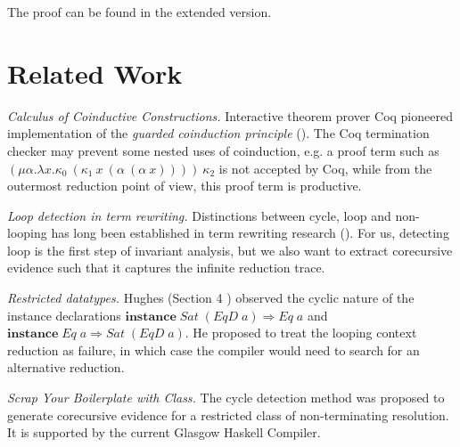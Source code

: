 \documentclass{llncs}
\newcommand{\Conid}[1]{\mathit{#1}}
\newcommand{\Varid}[1]{\mathit{#1}}
\begin{document}
The proof can be found in the extended version.













\section{Related Work}
\label{relwork}
\emph{Calculus of Coinductive Constructions.} Interactive theorem prover Coq pioneered implementation of the \textit{guarded coinduction principle} (\cite{coquand1994infinite,gimenez1996}).  
The Coq termination checker may prevent some nested uses of coinduction, e.g. a proof term such as $(\mu \alpha . \lambda x . \kappa_0\ (\kappa_1\ x\ (\alpha\ (\alpha\ x)))) \ \kappa_2$ is not accepted by Coq, while from the outermost reduction point of view, this proof term is productive. 

\emph{Loop detection in term rewriting.} Distinctions between cycle, loop and non-looping
 has long been established in term rewriting research (\cite{dershowitz1987,zantema1996non}). For us, detecting loop is the first step of invariant analysis, but we also want to extract corecursive evidence such that it captures the infinite reduction trace. 


\emph{Restricted datatypes.} Hughes (Section 4 \cite{hughes1999restricted})
observed the cyclic nature of the instance declarations \ensuremath{\mathbf{instance}\;\Conid{Sat}\;(\Conid{EqD}\;\Varid{a})\Rightarrow \Conid{Eq}\;\Varid{a}} and
\ensuremath{\mathbf{instance}\;\Conid{Eq}\;\Varid{a}\Rightarrow \Conid{Sat}\;(\Conid{EqD}\;\Varid{a})}. He proposed to treat the looping context
reduction as failure, in which case the compiler would need to search for an alternative
reduction. 


\emph{Scrap Your Boilerplate with Class.} The cycle
detection method \cite{Lammel:2005} was proposed to
generate corecursive evidence for a restricted
class of non-terminating resolution. It is supported by the current Glasgow Haskell Compiler. 
\end{document}

